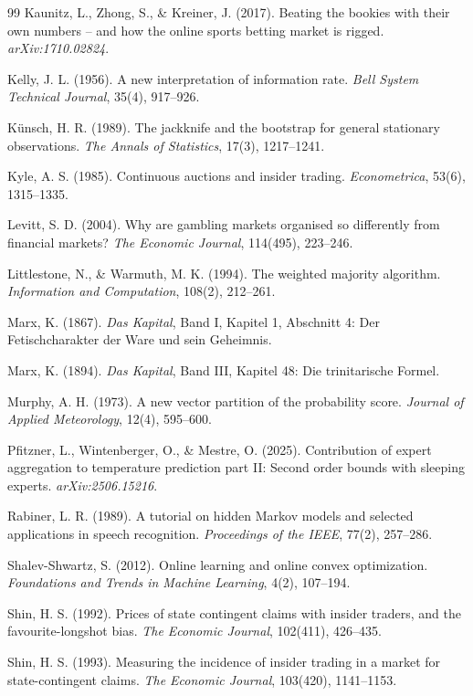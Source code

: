 \documentclass[12pt,a4paper,oneside]{report}
\renewcommand{\_}{\oldunderscore\allowbreak}
\theoremstyle{definition}
\theoremstyle{plain}
\theoremstyle{definition}   %
\begin{document}
\begin{thebibliography}{99}
 Kaunitz, L., Zhong, S., \& Kreiner, J. (2017). Beating the bookies with
their own numbers -- and how the online sports betting market is rigged.
\emph{arXiv:1710.02824}.

 Kelly, J. L. (1956). A new interpretation of information rate.
\emph{Bell System Technical Journal}, 35(4), 917--926.

 Künsch, H. R. (1989). The jackknife and the bootstrap for general
stationary observations. \emph{The Annals of Statistics}, 17(3), 1217--1241.

 Kyle, A. S. (1985). Continuous auctions and insider trading.
\emph{Econometrica}, 53(6), 1315--1335.

 Levitt, S. D. (2004). Why are gambling markets organised so differently
from financial markets? \emph{The Economic Journal}, 114(495), 223--246.

 Littlestone, N., \& Warmuth, M. K. (1994). The weighted majority
algorithm. \emph{Information and Computation}, 108(2), 212--261.

 Marx, K. (1867). \emph{Das Kapital}, Band I, Kapitel 1, Abschnitt 4:
Der Fetischcharakter der Ware und sein Geheimnis.

 Marx, K. (1894). \emph{Das Kapital}, Band III, Kapitel 48:
Die trinitarische Formel.

 Murphy, A. H. (1973). A new vector partition of the probability score.
\emph{Journal of Applied Meteorology}, 12(4), 595--600.

 Pfitzner, L., Wintenberger, O., \& Mestre, O. (2025). Contribution of
expert aggregation to temperature prediction part II: Second order bounds with sleeping
experts. \emph{arXiv:2506.15216}.

 Rabiner, L. R. (1989). A tutorial on hidden Markov models and selected
applications in speech recognition. \emph{Proceedings of the IEEE}, 77(2), 257--286.

 Shalev-Shwartz, S. (2012). Online learning and online convex
optimization. \emph{Foundations and Trends in Machine Learning}, 4(2), 107--194.

 Shin, H. S. (1992). Prices of state contingent claims with insider traders,
and the favourite-longshot bias. \emph{The Economic Journal}, 102(411), 426--435.

 Shin, H. S. (1993). Measuring the incidence of insider trading in a market
for state-contingent claims. \emph{The Economic Journal}, 103(420), 1141--1153.


\end{thebibliography}
\end{document}
